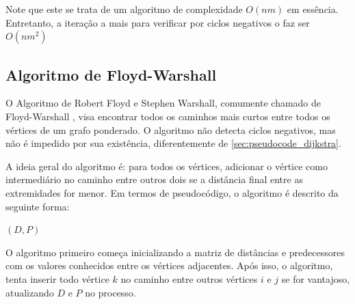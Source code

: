 Note que este se trata de um algoritmo de complexidade $O(nm)$ em
essência. Entretanto,
a iteração a mais para verificar por ciclos negativos o faz ser $O(n{m}^2)$

\subsection{Algoritmo de Floyd-Warshall}
\label{sec:pseudocode_floyd-warshall}

O Algoritmo de Robert Floyd e Stephen Warshall, comumente chamado de
Floyd-Warshall \cite{floydwarshallWikipedia}, visa encontrar todos os
caminhos mais curtos entre todos os vértices de um grafo ponderado. O
algoritmo não detecta ciclos negativos, mas não é impedido por sua
existência, diferentemente de \ref{sec:pseudocode_dijkstra}.

A ideia geral do algoritmo é: para todos os vértices, adicionar o
vértice como intermediário no caminho entre outros dois se a distância
final entre as extremidades for menor. Em termos de pseudocódigo, o
algoritmo é descrito da seguinte forma:

\begin{algorithm}
  \caption{Algoritmo de Floyd-Warshall}
  \begin{algorithmic}[0]
    \Statex
            \EndIf
          \EndFor
        \EndFor
      \EndFor
      \State \Return $(D, P)$
    \EndFunction
  \end{algorithmic}
\end{algorithm}
\FloatBarrier

O algoritmo primeiro começa inicializando a matriz de distâncias e
predecessores com os valores conhecidos entre os vértices adjacentes.
Após isso, o algoritmo, tenta inserir todo vértice $k$ no caminho
entre outros vértices $i$ e $j$ se for vantajoso, atualizando $D$ e
$P$ no processo.

